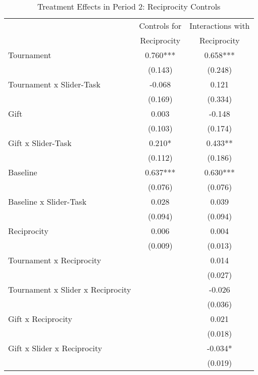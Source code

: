 \begin{table}[h]%
\setlength\tabcolsep{2pt}
\caption{Treatment Effects in Period 2: Reciprocity Controls}
\begin{center}%
{\small\renewcommand{\arraystretch}{.9}%
\begin{tabular}{lcc}
\hline\hline\noalign{\smallskip}
 & Controls for & Interactions with \\
 & Reciprocity  & Reciprocity \\
\hline\noalign{\smallskip}
Tournament          &       0.760***&       0.658***\\
                    &     (0.143)   &     (0.248)   \\[2mm]
Tournament x Slider-Task&      -0.068   &       0.121   \\
                    &     (0.169)   &     (0.334)   \\[2mm]
Gift                &       0.003   &      -0.148   \\
                    &     (0.103)   &     (0.174)   \\[2mm]
Gift x Slider-Task  &       0.210*  &       0.433** \\
                    &     (0.112)   &     (0.186)   \\[2mm]
Baseline            &       0.637***&       0.630***\\
                    &     (0.076)   &     (0.076)   \\[2mm]
Baseline x Slider-Task&       0.028   &       0.039   \\
                    &     (0.094)   &     (0.094)   \\[2mm]
Reciprocity         &       0.006   &       0.004   \\
                    &     (0.009)   &     (0.013)   \\
Tournament x Reciprocity&               &       0.014   \\
                    &               &     (0.027)   \\
Tournament x Slider x Reciprocity&               &      -0.026   \\
                    &               &     (0.036)   \\
Gift x Reciprocity  &               &       0.021   \\
                    &               &     (0.018)   \\
Gift x Slider x Reciprocity&               &      -0.034*  \\
                    &               &     (0.019)   \\

\end{tabular}}
\end{center}
\end{table}
